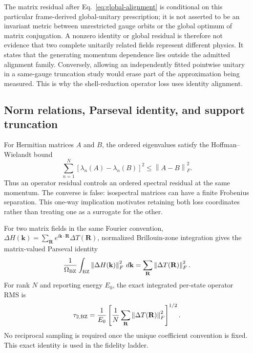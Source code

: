 \documentclass[11pt]{article}
\theoremstyle{definition}
\newcommand{\norm}[1]{\left\lVert#1\right\rVert}
\newcommand{\kvec}{\mathbf k}
\newcommand{\Rvec}{\mathbf R}
\begin{document}
The matrix residual after Eq.~\eqref{eq:global-alignment} is conditional on this
particular frame-derived global-unitary prescription; it is not asserted to be an
invariant metric between unrestricted gauge orbits or the global optimum of matrix
conjugation.  A nonzero identity or global residual is therefore
not evidence that two complete unitarily related fields represent different physics.
It states that the generating momentum dependence lies outside the admitted alignment
family.  Conversely, allowing
an independently fitted pointwise unitary in a same-gauge truncation study would erase
part of the approximation being measured.  This is why the shell-reduction operator
loss uses identity alignment.

\subsection{Norm relations, Parseval identity, and support truncation}

For Hermitian matrices $A$ and $B$, the ordered eigenvalues satisfy the
Hoffman--Wielandt bound
\begin{equation}
 \sum_{n=1}^{N}[\lambda_n(A)-\lambda_n(B)]^2
 \leq \norm{A-B}_F^2.
 \label{eq:hoffman-wielandt}
\end{equation}
Thus an operator residual controls an ordered spectral residual at the same momentum.
The converse is false: isospectral matrices can have a finite Frobenius separation.
This one-way implication motivates retaining both loss coordinates rather than treating
one as a surrogate for the other.

For two matrix fields in the same Fourier convention,
$\Delta H(\kvec)=\sum_{\Rvec}e^{i\kvec\cdot\Rvec}\Delta T(\Rvec)$, normalized
Brillouin-zone integration gives the matrix-valued Parseval identity
\begin{equation}
 \frac{1}{\Omega_{\rm BZ}}\int_{\rm BZ}
 \norm{\Delta H(\kvec)}_F^2\,d\kvec
 =\sum_{\Rvec}\norm{\Delta T(\Rvec)}_F^2.
 \label{eq:matrix-parseval}
\end{equation}
For rank $N$ and reporting energy $E_0$, the exact integrated per-state operator RMS is
\begin{equation}
 \tau_{2,{\rm BZ}}
 =\frac{1}{E_0}\left[
 \frac{1}{N}\sum_{\Rvec}\norm{\Delta T(\Rvec)}_F^2
 \right]^{1/2}.
 \label{eq:parseval-rms}
\end{equation}
No reciprocal sampling is required once the unique coefficient convention is fixed.
This exact identity is used in the fidelity ladder.
\end{document}
